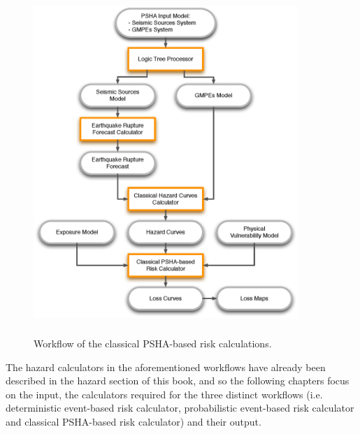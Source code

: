 \begin{figure}[ht]
\centering
\includegraphics[width=10cm,height=13cm]{./Figures/Part_Risk/Scheme_PSHA_calc.eps}
\caption{Workflow of the classical PSHA-based risk calculations.}
\label{fig:Scheme_classrisk_calc}
\end{figure}

The hazard calculators in the aforementioned workflows have already been described in the hazard section of this book, and so the following chapters focus on the input, the calculators required for the three distinct workflows (i.e. deterministic event-based risk calculator, probabilistic event-based risk calculator and classical PSHA-based risk calculator) and their output.
%